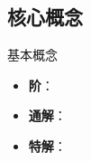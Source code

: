 \documentclass[UTF8, a4paper, 10pt]{ctexart} %
\begin{document}
\subsection{核心概念}
\begin{concept}{基本概念}
    \begin{itemize}[nosep]
        \item \textbf{阶}： \underline{\hspace{5cm}}
        \item \textbf{通解}： \underline{\hspace{5cm}}
        \item \textbf{特解}： \underline{\hspace{5cm}}
    \end{itemize}
\end{concept}
\end{document}

